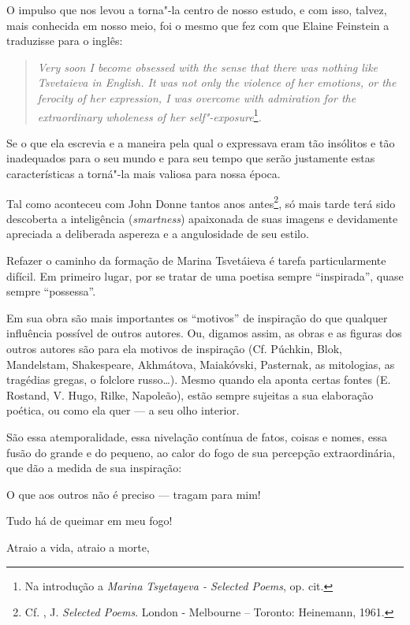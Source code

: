 O impulso que nos levou a torna"-la centro de nosso estudo, e com isso,
talvez, mais conhecida em nosso meio, foi o mesmo que fez com que Elaine
Feinstein a traduzisse para o inglês:

\begin{quote}
\emph{Very soon I become obsessed with the sense that there was nothing
like Tsvetaieva in English. It was not only the violence of her
emotions, or the ferocity of her expression, I was overcome with
admiration for the extraordinary wholeness of her
self"-exposure}\footnote{Na introdução a \emph{Marina} \emph{Tsyetayeva -
  Selected Poems}, op. cit.}\emph{.}
\end{quote}

Se o que ela escrevia e a maneira pela qual o expressava eram tão
insólitos e tão inadequados para o seu mundo e para seu tempo que serão
justamente estas características a torná"-la mais valiosa para nossa
época.

Tal como aconteceu com John Donne tantos anos antes\footnote{Cf. ,
  J. \emph{Selected Poems}. London - Melbourne -- Toronto: Heinemann,
  1961.}, só mais tarde terá sido descoberta a inteligência
(\emph{smartness}) apaixonada de suas imagens e devidamente apreciada a
deliberada aspereza e a angulosidade de seu estilo.

Refazer o caminho da formação de Marina Tsvetáieva é tarefa
particularmente difícil. Em primeiro lugar, por se tratar de uma poetisa
sempre ``inspirada'', quase sempre ``possessa''.

Em sua obra são mais importantes os ``motivos'' de inspiração do que
qualquer influência possível de outros autores. Ou, digamos assim, as
obras e as figuras dos outros autores são para ela motivos de inspiração
(Cf. Púchkin, Blok, Mandelstam, Shakespeare, Akhmátova, Maiakóvski,
Pasternak, as mitologias, as tragédias gregas, o folclore russo\ldots{}).
Mesmo quando ela aponta certas fontes (E. Rostand, V. Hugo, Rilke,
Napoleão), estão sempre sujeitas a sua elaboração poética, ou como ela
quer --- a seu olho interior.

São essa atemporalidade, essa nivelação contínua de fatos, coisas e
nomes, essa fusão do grande e do pequeno, ao calor do fogo de sua
percepção extraordinária, que dão a medida de sua inspiração:

O que aos outros não é preciso --- tragam para mim!

Tudo há de queimar em meu fogo!

Atraio a vida, atraio a morte,

